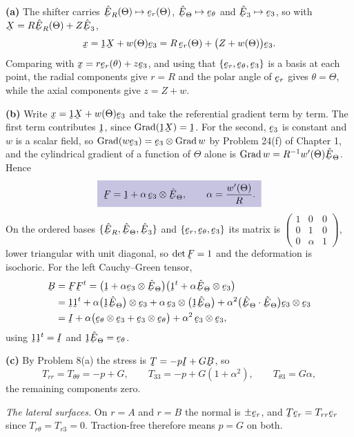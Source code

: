 \begin{solution}
\textbf{(a)} The shifter carries $\hbE_{R}(\Theta)\mapsto\ber(\Theta)$,
$\hbE_{\Theta}\mapsto\bet$ and $\hbE_{3}\mapsto\be_{3}$, so with
$\bX=R\hbE_{R}(\Theta)+Z\hbE_{3}$,
\[
   \bx=\shift\bX+w(\Theta)\be_{3}
   =R\,\ber(\Theta)+\big(Z+w(\Theta)\big)\be_{3}.
\]
Comparing with $\bx=r\ber(\theta)+z\be_{3}$, and using that
$\{\ber,\bet,\be_{3}\}$ is a basis at each point, the radial components
give $r=R$ and the polar angle of $\ber$ gives $\theta=\Theta$, while
the axial components give $z=Z+w$.

\textbf{(b)} Write $\bx=\shift\bX+w(\Theta)\be_{3}$ and take the
referential gradient term by term. The first term contributes $\shift$,
since $\Grad(\shift\bX)=\shift$. For the second, $\be_{3}$ is constant
and $w$ is a scalar field, so $\Grad(w\be_{3})=\be_{3}\otimes\Grad w$ by
Problem 24(f) of Chapter 1, and the cylindrical gradient of a function
of $\Theta$ alone is $\Grad w=R^{-1}w'(\Theta)\hbE_{\Theta}$. Hence
\[
   \boxed{\;\bF=\shift+\alpha\,\be_{3}\otimes\hbE_{\Theta},
   \qquad \alpha=\frac{w'(\Theta)}{R} .\;}
\]
On the ordered bases $\{\hbE_{R},\hbE_{\Theta},\hbE_{3}\}$ and
$\{\ber,\bet,\be_{3}\}$ its matrix is
$\left(\begin{smallmatrix}1&0&0\\0&1&0\\0&\alpha&1\end{smallmatrix}
\right)$, lower triangular with unit diagonal, so $\det\bF=1$ and the
deformation is isochoric. For the left Cauchy--Green tensor,
\[
\begin{aligned}
   \bB&=\bF\bF^{t}
   =\big(\shift+\alpha\be_{3}\otimes\hbE_{\Theta}\big)
    \big(\shift^{t}+\alpha\hbE_{\Theta}\otimes\be_{3}\big)\\
   &=\shift\shift^{t}
    +\alpha\big(\shift\hbE_{\Theta}\big)\otimes\be_{3}
    +\alpha\,\be_{3}\otimes\big(\shift\hbE_{\Theta}\big)
    +\alpha^{2}\big(\ip{\hbE_{\Theta}}{\hbE_{\Theta}}\big)
     \be_{3}\otimes\be_{3}\\
   &=\I+\alpha\big(\bet\otimes\be_{3}+\be_{3}\otimes\bet\big)
    +\alpha^{2}\,\be_{3}\otimes\be_{3},
\end{aligned}
\]
using $\shift\shift^{t}=\I$ and $\shift\hbE_{\Theta}=\bet$.

\textbf{(c)} By Problem 8(a) the stress is $\bT=-p\I+G\bB$, so
\[
   T_{rr}=T_{\theta\theta}=-p+G,\qquad
   T_{33}=-p+G(1+\alpha^{2}),\qquad
   T_{\theta3}=G\alpha ,
\]
the remaining components zero.

\emph{The lateral surfaces.} On $r=A$ and $r=B$ the normal is $\pm\ber$,
and $\bT\ber=T_{rr}\ber$ since $T_{r\theta}=T_{r3}=0$. Traction-free
therefore means $p=G$ on both.


\end{solution}
